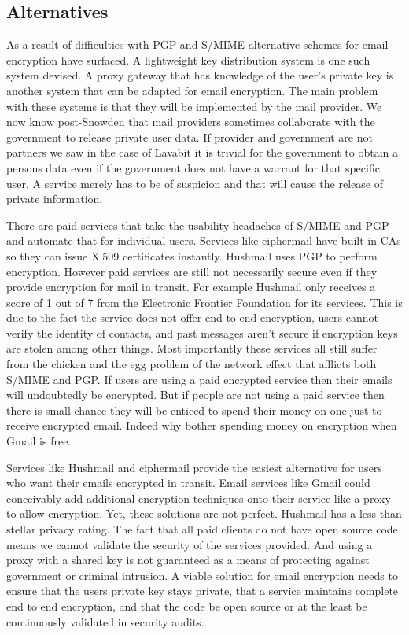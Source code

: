 \documentclass{article}
\begin{document}
\subsection{Alternatives}
\par As a result of difficulties with PGP and S/MIME alternative schemes for email encryption have surfaced. A lightweight key distribution system\cite{adida2005lightweight} is one such system devised. A proxy gateway that has knowledge of the user's private key is another system that can be adapted for email encryption\cite{blaze1998divertible}. The main problem with these systems is that they will be implemented by the mail provider. We now know post-Snowden that mail providers sometimes collaborate with the government to release private user data. If provider and government are not partners we saw in the case of Lavabit it is trivial for the government to obtain a persons data even if the government does not have a warrant for that specific user. A service merely has to be of suspicion and that will cause the release of private information\cite{wiki-lavabit}.
\par There are paid services that take the usability headaches of S/MIME and PGP and automate that for individual users. Services like ciphermail have built in CAs\cite{ciphermail-gateway} so they can issue X.509 certificates instantly. Hushmail uses PGP to perform encryption\cite{hushmail}. However paid services are still not necessarily secure even if they provide encryption for mail in transit. For example Hushmail only receives a score of 1 out of 7 from the Electronic Frontier Foundation for its services\cite{eff-scorecard}. This is due to the fact the service does not offer end to end encryption, users cannot verify the identity of contacts, and past messages aren't secure if encryption keys are stolen among other things. Most importantly these services all still suffer from the chicken and the egg problem of the network effect that afflicts both S/MIME and PGP. If users are using a paid encrypted service then their emails will undoubtedly be encrypted. But if people are not using a paid service then there is small chance they will be enticed to spend their money on one just to receive encrypted email. Indeed why bother spending money on encryption when Gmail is free.
\par Services like Hushmail and ciphermail provide the easiest alternative for users who want their emails encrypted in transit. Email services like Gmail could conceivably add additional encryption techniques onto their service like a proxy to allow encryption. Yet, these solutions are not perfect. Hushmail has a less than stellar privacy rating. The fact that all paid clients do not have open source code means we cannot validate the security of the services provided. And using a proxy with a shared key is not guaranteed as a means of protecting against government or criminal intrusion. A viable solution for email encryption needs to ensure that the users private key stays private, that a service maintains complete end to end encryption, and that the code be open source or at the least be continuously validated in security audits.
\end{document}
